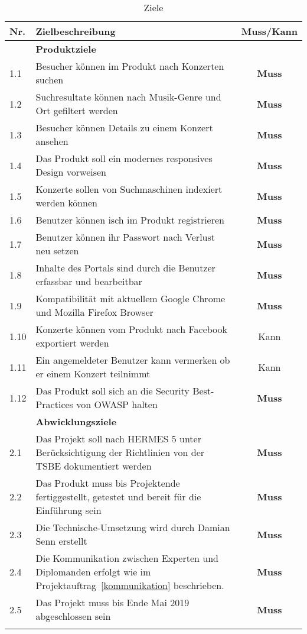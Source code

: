 \begin{longtable}[]{@{}lp{10.5cm}c@{}}
  \toprule
  Nr.  & Zielbeschreibung                                                                                                   & Muss/Kann\tabularnewline
  \toprule
       & \textbf{Produktziele}\tabularnewline
  \midrule
  1.1  & Besucher können im Produkt nach Konzerten suchen                                                                   & \textbf{Muss}\tabularnewline
  1.2  & Suchresultate können nach Musik-Genre und Ort gefiltert werden                                                     & \textbf{Muss}\tabularnewline
  1.3  & Besucher können Details zu einem Konzert ansehen                                                                   & \textbf{Muss}\tabularnewline
  1.4  & Das Produkt soll ein modernes responsives Design vorweisen                                                         & \textbf{Muss}\tabularnewline
  1.5  & Konzerte sollen von Suchmaschinen indexiert werden können                                                          & \textbf{Muss}\tabularnewline
  1.6  & Benutzer können isch im Produkt registrieren                                                                       & \textbf{Muss}\tabularnewline
  1.7  & Benutzer können ihr Passwort nach Verlust neu setzen                                                               & \textbf{Muss}\tabularnewline
  1.8  & Inhalte des Portals sind durch die Benutzer erfassbar und bearbeitbar                                              & \textbf{Muss}\tabularnewline
  1.9  & Kompatibilität mit aktuellem Google Chrome und Mozilla Firefox Browser                                             & \textbf{Muss}\tabularnewline
  1.10 & Konzerte können vom Produkt nach Facebook exportiert werden                                                        & Kann\tabularnewline
  1.11 & Ein angemeldeter Benutzer kann vermerken ob er einem Konzert teilnimmt                                             & Kann\tabularnewline
  1.12 & Das Produkt soll sich an die Security Best-Practices von OWASP halten                                              & \textbf{Muss}\tabularnewline
  \toprule
       & \textbf{Abwicklungsziele}\tabularnewline
  \midrule
  2.1  & Das Projekt soll nach HERMES 5 unter Berücksichtigung der Richtlinien von der TSBE dokumentiert werden             & \textbf{Muss}\tabularnewline
  2.2  & Das Produkt muss bis Projektende fertiggestellt, getestet und bereit für die Einführung sein                       & \textbf{Muss}\tabularnewline
  2.3  & Die Technische-Umsetzung wird durch Damian Senn erstellt                                                           & \textbf{Muss}\tabularnewline
  2.4  & Die Kommunikation zwischen Experten und Diplomanden erfolgt wie im Projektauftrag~\ref{kommunikation} beschrieben. & \textbf{Muss}\tabularnewline
  2.5  & Das Projekt muss bis Ende Mai 2019 abgeschlossen sein                                                              & \textbf{Muss}\tabularnewline
  \bottomrule
  \caption{Ziele}
\end{longtable}
